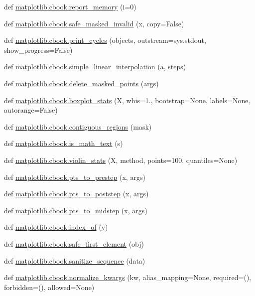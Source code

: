 \begin{DoxyCompactItemize}
\item 
def \hyperlink{namespacematplotlib_1_1cbook_a535511c13efe4c9961e0c49ad906fe8b}{matplotlib.\+cbook.\+report\+\_\+memory} (i=0)
\item 
def \hyperlink{namespacematplotlib_1_1cbook_a1b513669a33f2fff0c61d719ea76f0a1}{matplotlib.\+cbook.\+safe\+\_\+masked\+\_\+invalid} (x, copy=False)
\item 
def \hyperlink{namespacematplotlib_1_1cbook_ad14ca04fafb21b27932fe178ee5d32b6}{matplotlib.\+cbook.\+print\+\_\+cycles} (objects, outstream=sys.\+stdout, show\+\_\+progress=False)
\item 
def \hyperlink{namespacematplotlib_1_1cbook_a10de3acab7db43705a4a1a2ce7b12098}{matplotlib.\+cbook.\+simple\+\_\+linear\+\_\+interpolation} (a, steps)
\item 
def \hyperlink{namespacematplotlib_1_1cbook_aaef0de8c17f94f25ceba253a5abbc33e}{matplotlib.\+cbook.\+delete\+\_\+masked\+\_\+points} (args)
\item 
def \hyperlink{namespacematplotlib_1_1cbook_a09feb80736ebe2521845f87e1941bc14}{matplotlib.\+cbook.\+boxplot\+\_\+stats} (X, whis=1., bootstrap=None, labels=None, autorange=False)
\item 
def \hyperlink{namespacematplotlib_1_1cbook_aee5e1f5850d10d2ac4ce893123eadf2d}{matplotlib.\+cbook.\+contiguous\+\_\+regions} (mask)
\item 
def \hyperlink{namespacematplotlib_1_1cbook_af441c24cff462a6cd0aacd90ff7c7110}{matplotlib.\+cbook.\+is\+\_\+math\+\_\+text} (s)
\item 
def \hyperlink{namespacematplotlib_1_1cbook_acb8ae01168625dcd6f0dbcd72fd78176}{matplotlib.\+cbook.\+violin\+\_\+stats} (X, method, points=100, quantiles=None)
\item 
def \hyperlink{namespacematplotlib_1_1cbook_adb99f63714944cfeaad9052297db34d1}{matplotlib.\+cbook.\+pts\+\_\+to\+\_\+prestep} (x, args)
\item 
def \hyperlink{namespacematplotlib_1_1cbook_a72e84fb424d53d1657c70a6916a06ce4}{matplotlib.\+cbook.\+pts\+\_\+to\+\_\+poststep} (x, args)
\item 
def \hyperlink{namespacematplotlib_1_1cbook_abf6af67829ca61096a331b8f8294e729}{matplotlib.\+cbook.\+pts\+\_\+to\+\_\+midstep} (x, args)
\item 
def \hyperlink{namespacematplotlib_1_1cbook_a7ae5af68c98ed9f012d32478c0666b41}{matplotlib.\+cbook.\+index\+\_\+of} (y)
\item 
def \hyperlink{namespacematplotlib_1_1cbook_a6a6f0c198d6daf339623a024c000ced9}{matplotlib.\+cbook.\+safe\+\_\+first\+\_\+element} (obj)
\item 
def \hyperlink{namespacematplotlib_1_1cbook_a49db6f38fc64b1429d004a19c44d5582}{matplotlib.\+cbook.\+sanitize\+\_\+sequence} (data)
\item 
def \hyperlink{namespacematplotlib_1_1cbook_a144ca6cd74e33dfa5f931e3330047cad}{matplotlib.\+cbook.\+normalize\+\_\+kwargs} (kw, alias\+\_\+mapping=None, required=(), forbidden=(), allowed=None)
\end{DoxyCompactItemize}
